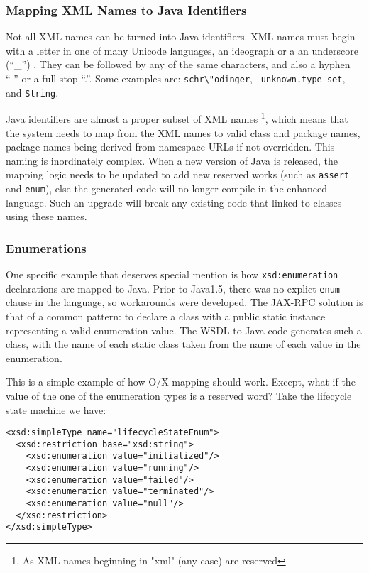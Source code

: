 \subsubsection{Mapping XML Names to Java Identifiers}
\label{objections:o-x:names}


Not all XML names can be turned into Java identifiers. 
XML names must begin with a letter in one of many Unicode languages,
an ideograph or a an underscore (``\_'') . They can be followed by any of the same
characters, and also a hyphen ``-'' or a full stop ``.''. Some examples
are: \verb|schr\"odinger|, \verb|_unknown.type-set|, and \verb|String|.

Java identifiers are almost a proper subset of XML names
\footnote{As XML names beginning in "xml" (any case) are reserved},
which means that the system needs to map from the XML names to valid
class and package names, package names being derived from namespace URLs
if not overridden. This naming is inordinately complex. When a new version
of Java is released, the mapping logic needs to be updated to add new
reserved works (such as \verb|assert| and \verb|enum|), else the
generated code will no longer compile in the enhanced language. Such an
upgrade will break any existing code that linked to classes using these
names. 


\subsubsection{Enumerations}

One specific example that deserves special mention is how
\verb$xsd:enumeration$ declarations are mapped to Java. Prior to
Java1.5, there was no explict \verb$enum$ clause in the language, so
workarounds were developed. The JAX-RPC solution is that of a common
pattern: to declare a class with a public static instance representing
a valid enumeration value. The WSDL to Java code generates such a
class, with the name of each static class taken from the name of each
value in the enumeration. 

This is a simple example of how O/X mapping should work. Except, what if the
value of the one of the enumeration types is a reserved word?
Take the lifecycle state machine we have:

\begin{verbatim}
<xsd:simpleType name="lifecycleStateEnum">
  <xsd:restriction base="xsd:string"> 
    <xsd:enumeration value="initialized"/> 
    <xsd:enumeration value="running"/> 
    <xsd:enumeration value="failed"/> 
    <xsd:enumeration value="terminated"/> 
    <xsd:enumeration value="null"/> 
  </xsd:restriction>
</xsd:simpleType>
\end{verbatim}


